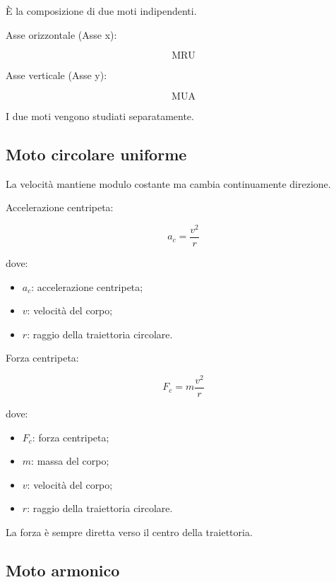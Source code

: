È la composizione di due moti indipendenti.

\noindent Asse orizzontale (Asse x):

\[
\text{MRU}
\]

\noindent Asse verticale (Asse y):

\[
\text{MUA}
\]

\noindent I due moti vengono studiati separatamente.

\vspace{0.3cm}

\subsection{Moto circolare uniforme}

La velocità mantiene modulo costante ma cambia continuamente direzione.

\noindent Accelerazione centripeta:

\[
a_c=\frac{v^2}{r}
\]

\noindent dove:

\begin{itemize}
\item $a_c$: accelerazione centripeta;
\item $v$: velocità del corpo;
\item $r$: raggio della traiettoria circolare.
\end{itemize}

\vspace{0.2cm}

\noindent Forza centripeta:

\[
F_c=m\frac{v^2}{r}
\]

\noindent dove:

\begin{itemize}
\item $F_c$: forza centripeta;
\item $m$: massa del corpo;
\item $v$: velocità del corpo;
\item $r$: raggio della traiettoria circolare.
\end{itemize}

\noindent La forza è sempre diretta verso il centro della traiettoria.

\vspace{0.3cm}

\subsection{Moto armonico}

